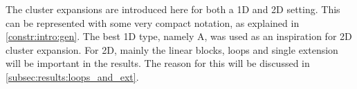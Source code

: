 The cluster expansions are introduced here for both a 1D and 2D setting. This can be represented with some very compact notation, as explained in \cref{constr:intro:gen}. The best 1D type, namely A, was used as an inspiration for 2D cluster expansion. For 2D, mainly the linear blocks, loops and single extension will be important in the results. The reason for this will be discussed in \cref{subsec:results:loops_and_ext}.